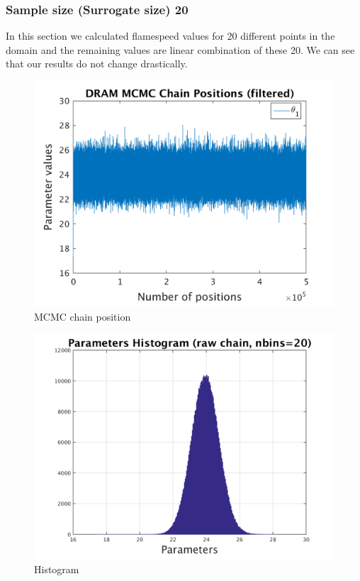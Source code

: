 \subsubsection{Sample size (Surrogate size) 20 }

In this section we calculated flamespeed values for 20 different points in the domain and the remaining values are linear combination of these 20. We can see that our results do not change drastically. 

\begin{figure}[H]
  
  \centering
   \includegraphics[scale=0.75]{100_results/outputData_20/simple_ip_chain_pos_filt}
   \caption{MCMC chain position }
\end{figure}


\begin{figure}[H]
  
  \centering
   \includegraphics[scale=0.75]{100_results/outputData_20/simple_ip_hist_raw}
   \caption{Histogram}
\end{figure}



